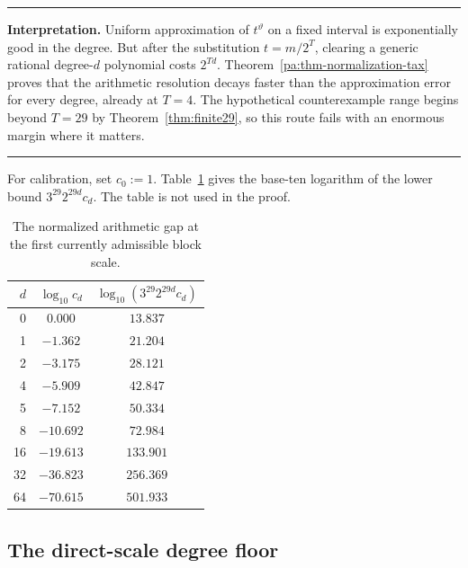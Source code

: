 \documentclass[11pt,oneside]{article}
\theoremstyle{definition}
\theoremstyle{remark}
\newcommand{\thetaq}{\vartheta}
\newenvironment{resultbox}
{\begin{center}\begin{minipage}{0.94\textwidth}\hrule\vspace{0.45em}}
{\vspace{0.35em}\hrule\end{minipage}\end{center}}
\begin{document}
\begin{resultbox}
\textbf{Interpretation.}
Uniform approximation of \(t^{\thetaq}\) on a fixed interval is exponentially good in the
degree.  But after the substitution \(t=m/2^T\), clearing a generic rational degree-\(d\)
polynomial costs \(2^{Td}\).  Theorem~\ref{pa:thm-normalization-tax} proves that the arithmetic
resolution decays faster than the approximation error for every degree, already at \(T=4\).
The hypothetical counterexample range begins beyond \(T=29\) by
Theorem~\ref{thm:finite29}, so this route fails with an enormous margin where it matters.
\end{resultbox}

For calibration, set \(c_0:=1\).  Table~\ref{pa:tab-tax29} gives the base-ten logarithm of the lower bound
\(3^{29}2^{29d}c_d\).  The table is not used in the proof.

\begin{table}[htbp]
\centering
\begin{tabular}{@{}rcc@{}}
\toprule
\(d\) & \(\log_{10} c_d\) & \(\log_{10}(3^{29}2^{29d}c_d)\)\\
\midrule
0  & \(0.000\)   & \(13.837\)\\
1  & \(-1.362\)  & \(21.204\)\\
2  & \(-3.175\)  & \(28.121\)\\
4  & \(-5.909\)  & \(42.847\)\\
5  & \(-7.152\)  & \(50.334\)\\
8  & \(-10.692\) & \(72.984\)\\
16 & \(-19.613\) & \(133.901\)\\
32 & \(-36.823\) & \(256.369\)\\
64 & \(-70.615\) & \(501.933\)\\
\bottomrule
\end{tabular}
\caption{The normalized arithmetic gap at the first currently admissible block scale.}
\label{pa:tab-tax29}
\end{table}

\subsection{The direct-scale degree floor}
\label{pa:sub-direct-degree}
\end{document}
